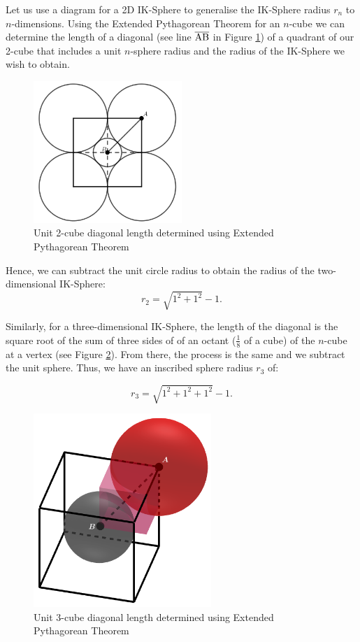 Let us use a diagram for a 2D IK-Sphere to generalise the IK-Sphere radius $r_n$ to $n$-dimensions. Using the Extended Pythagorean Theorem for an $n$-cube we can determine the length of a diagonal (see line $\overline{\rm AB}$ in Figure \ref{fig:2d diagonal}) of a quadrant of our 2-cube that includes a unit $n$-sphere radius and the radius of the IK-Sphere we wish to obtain. 
\begin{figure}[h]
    \centering
    \includegraphics[width=0.5\textwidth]{images/diagonal 2d.png}
    \caption{\label{fig:2d diagonal}Unit 2-cube diagonal length determined using Extended Pythagorean Theorem}
\end{figure}

\noindent Hence, we can subtract the unit circle radius to obtain the radius of the two-dimensional IK-Sphere: $$r_2 = \sqrt{1^2+1^2}-1.$$  %

Similarly, for a three-dimensional IK-Sphere, the length of the diagonal is the square root of the sum of three sides of of an octant ($\frac{1}{8}$ of a cube) of the $n$-cube at a vertex (see Figure \ref{fig:3d diagonal}). From there, the process is the same and we subtract the unit sphere. Thus, we have an inscribed sphere radius $r_3$ of: 

\begin{equation*}
    r_3=\sqrt{1^2+1^2+1^2}-1.
\end{equation*}

\begin{figure}[H]
    \centering
    \includegraphics[width=0.6\textwidth]{images/3d diagonal.png}
    \caption{\label{fig:3d diagonal}Unit 3-cube diagonal length determined using Extended Pythagorean Theorem}
\end{figure}

